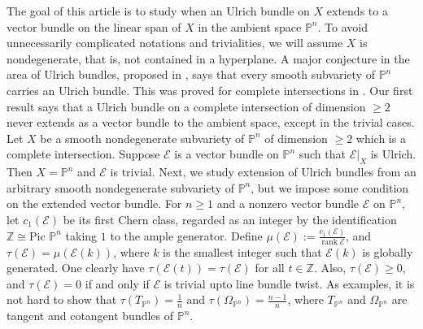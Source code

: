 \documentclass[11pt,letterpaper]{amsart}
\newenvironment{manualtheorem}[1]{%
  \renewcommand\themanualtheoreminner{#1}%
  \manualtheoreminner
}{\endmanualtheoreminner}
\begin{document}
The goal of this article is to study when an Ulrich bundle on $X$ extends to a vector bundle on the linear span of $X$ in the ambient space $\mathbb{P}^n$. To avoid unnecessarily complicated notations and trivialities, we will assume $X$ is nondegenerate, that is, not contained in a hyperplane. A major conjecture in the area of Ulrich bundles, proposed in \cite{eisenbud2003resultants}, says that every smooth subvariety of $\mathbb{P}^n$ carries an Ulrich bundle. This was proved for complete intersections in \cite{herzog1991linear}. Our first result says that a Ulrich bundle on a complete intersection of dimension $\geq 2$ never extends as a vector bundle to the ambient space, except in the trivial cases.
\begin{manualtheorem}{A}\label{A}
    Let $X$ be a smooth nondegenerate subvariety of $\mathbb{P}^n$
of dimension $\ge 2$ which is a complete intersection.
Suppose $\mathcal{E}$ is a vector bundle on $\mathbb{P}^n$ such that
$\mathcal{E}|_X$ is Ulrich. Then $X=\mathbb{P}^n$
and $\mathcal{E}$ is trivial.
\end{manualtheorem}
Next, we study extension of Ulrich bundles from an arbitrary smooth nondegenerate subvariety of $\mathbb{P}^n$, but we impose some condition on the extended vector bundle. For $n\geq 1$ and a nonzero vector bundle $\mathcal{E}$ on $\mathbb{P}^n$, let $c_1(\mathcal{E})$ be its first Chern class, regarded as an integer by the identification $\mathbb{Z}\cong \text{Pic }\mathbb{P}^n$ taking $1$ to the ample generator. Define $\mu(\mathcal{E}):=\frac{c_1(\mathcal{E})}{\operatorname{rank}\mathcal{E}}$, and $\tau(\mathcal{E})=\mu(\mathcal{E}(k))$, where $k$ is the smallest integer such that $\mathcal{E}(k)$ is globally generated. One clearly have  $\tau(\mathcal E(t))=\tau(\mathcal E)$
 for all $t\in\mathbb Z$. Also, $\tau(\mathcal{E})\geq 0$, and $\tau(\mathcal{E})= 0$ if and only if $\mathcal{E}$ is trivial upto line bundle twist. As examples, it is not hard to show that $\tau(T_{\mathbb{P}^n})=\frac{1}{n}$ and $\tau(\Omega_{\mathbb{P}^n})=\frac{n-1}{n}$, where $T_{\mathbb{P}^n}$ and $\Omega_{\mathbb{P}^n}$ are tangent and cotangent bundles of $\mathbb{P}^n$.
\end{document}
